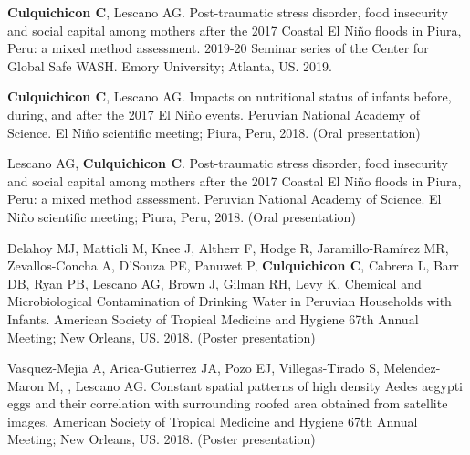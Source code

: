 \documentclass[10pt]{article}
\begin{document}
\begin{etaremune}
	\item {\bf Culquichicon C}, Lescano AG. Post-traumatic stress disorder, food insecurity and social capital among mothers after the 2017 Coastal El Niño floods in Piura, Peru: a mixed method assessment. 2019-20 Seminar series of the Center for Global Safe WASH. Emory University; Atlanta, US. 2019. \\
	\vspace{-0.23in}
	
	\item {\bf Culquichicon C}, Lescano AG. Impacts on nutritional status of infants before, during, and after the 2017 El Niño events. Peruvian National Academy of Science. El Niño scientific meeting; Piura, Peru, 2018. (Oral presentation) \\
	\vspace{-0.23in}
	
	\item Lescano AG, {\bf Culquichicon C}. Post-traumatic stress disorder, food insecurity and social capital among mothers after the 2017 Coastal El Niño floods in Piura, Peru: a mixed method assessment. Peruvian National Academy of Science. El Niño scientific meeting; Piura, Peru, 2018. (Oral presentation) \\
	\vspace{-0.23in}
	
	\item Delahoy MJ, Mattioli M, Knee J, Altherr F, Hodge R, Jaramillo-Ramírez MR, Zevallos-Concha A, D’Souza PE, Panuwet P, {\bf Culquichicon C}, Cabrera L, Barr DB, Ryan PB, Lescano AG, Brown J, Gilman RH, Levy K. Chemical and Microbiological Contamination of Drinking Water in Peruvian Households with Infants. American Society of Tropical Medicine and Hygiene 67th Annual Meeting; New Orleans, US. 2018. (Poster presentation) \\
	\vspace{-0.23in}
	
	\item Vasquez-Mejia A, Arica-Gutierrez JA, Pozo EJ, Villegas-Tirado S, Melendez-Maron M, , Lescano AG. Constant spatial patterns of high density Aedes aegypti eggs and their correlation with surrounding roofed area obtained from satellite images. American Society of Tropical Medicine and Hygiene 67th Annual Meeting; New Orleans, US. 2018. (Poster presentation) \\
	\vspace{-0.23in}
	

\end{etaremune}
\end{document}
